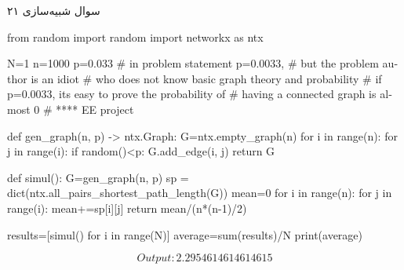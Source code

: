 سوال شبیه‌سازی ۲۱

\begin{latin}
\begin{python}
from random import random
import networkx as ntx

N=1
n=1000
p=0.033
# in problem statement p=0.0033,
# but the problem author is an idiot
# who does not know basic graph theory and probability
# if p=0.0033, its easy to prove the probability of
# having a connected graph is almost 0
# **** EE project


def gen_graph(n, p) -> ntx.Graph:
	G=ntx.empty_graph(n)
	for i in range(n):
		for j in range(i):
			if random()<p:
				G.add_edge(i, j)
	return G

def simul():
	G=gen_graph(n, p)
	sp = dict(ntx.all_pairs_shortest_path_length(G))
	mean=0
	for i in range(n):
		for j in range(i):
			mean+=sp[i][j]
	return mean/(n*(n-1)/2)

results=[simul() for i in range(N)]
average=sum(results)/N
print(average)
\end{python}
\end{latin}

$$
Output: 2.2954614614614615
$$
